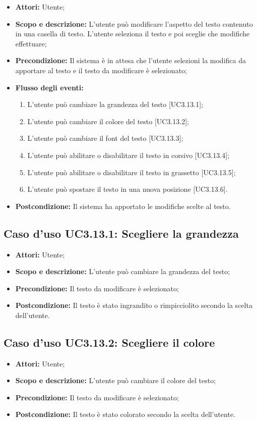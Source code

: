\begin{itemize}
	\item \textbf{Attori:} Utente;
	\item \textbf{Scopo e descrizione:} L'utente può modificare l'aspetto del testo contenuto in una casella di testo. L'utente seleziona il testo e poi sceglie che modifiche effettuare;
	\item \textbf{Precondizione:} Il sistema è in attesa che l'utente selezioni la modifica da apportare al testo e il testo da modificare è selezionato;
	\item \textbf{Flusso degli eventi:}
	\begin{enumerate}
		\item L'utente può cambiare la grandezza del testo [UC3.13.1];
		\item L'utente può cambiare il colore del testo [UC3.13.2];
		\item L'utente può cambiare il font del testo [UC3.13.3];
		\item L'utente può abilitare o disabilitare il testo in corsivo [UC3.13.4];
		\item L'utente può abilitare o disabilitare il testo in grassetto [UC3.13.5];
		\item L'utente può spostare il testo in una nuova posizione [UC3.13.6].
	\end{enumerate}
	\item \textbf{Postcondizione:} Il sistema ha apportato le modifiche scelte al testo.
\end{itemize}

\subsection{Caso d'uso UC3.13.1: Scegliere la grandezza}
\begin{itemize}
	\item \textbf{Attori:} Utente;
	\item \textbf{Scopo e descrizione:} L'utente può cambiare la grandezza del testo;
	\item \textbf{Precondizione:} Il testo da modificare è selezionato;
	\item \textbf{Postcondizione:} Il testo è stato ingrandito o rimpicciolito secondo la scelta dell'utente.
\end{itemize}

\subsection{Caso d'uso UC3.13.2: Scegliere il colore}
\begin{itemize}
	\item \textbf{Attori:} Utente;
	\item \textbf{Scopo e descrizione:} L'utente può cambiare il colore del testo;
	\item \textbf{Precondizione:} Il testo da modificare è selezionato;
	\item \textbf{Postcondizione:} Il testo è stato colorato secondo la scelta dell'utente.
\end{itemize}

